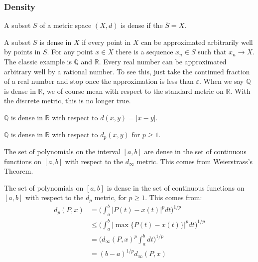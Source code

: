 \documentclass[crop=false,class=article,oneside]{standalone}
\begin{document}
        \subsubsection{Density}
            \begin{definition}
                A subset $S$ of a metric space $(X,d)$
                is dense if the $\overline{S}=X$.
            \end{definition}
            A subset $S$ is dense in $X$ if every point
            in $X$ can be approximated arbitrarily well
            by points in $S$. For any point $x\in{X}$
            there is a sequence $x_{n}\in{S}$
            such that $x_{n}\rightarrow{X}$. The
            classic example is $\mathbb{Q}$ and
            $\mathbb{R}$. Every real number can be
            approximated arbitrary well by a rational
            number. To see this, just take the continued
            fraction of a real number and stop once
            the approximation is less than
            $\varepsilon$. When we say $\mathbb{Q}$ is
            dense in $\mathbb{R}$, we of course mean with
            respect to the standard metric on $\mathbb{R}$.
            With the discrete metric, this is no longer
            true. 
            \begin{example}
                $\mathbb{Q}$ is dense in $\mathbb{R}$
                with respect to $d(x,y)=|x-y|$.
            \end{example}
            \begin{example}
                $\mathbb{Q}$ is dense in
                $\mathbb{R}$ with respect to
                $d_{p}(x,y)$ for $p\geq{1}$.
            \end{example}
            \begin{example}
                The set of polynomials on the interval
                $[a,b]$ are dense in the set of
                continuous functions on $[a,b]$ with
                respect to the $d_{\infty}$ metric.
                This comes from Weierstrass's Theorem.
            \end{example}
            \begin{example}
                The set of polynomials on $[a,b]$
                is dense in the set of continuous
                functions on $[a,b]$ with respect to
                the $d_{p}$ metric, for $p\geq{1}$. This
                comes from:
                \begin{align*}
                    d_{p}(P,x)&=
                    \bigg(
                        \int_{a}^{b}|P(t)-x(t)|^{p}dt
                    \bigg)^{1/p}\\
                    &\leq\bigg(
                        \int_{a}^{b}
                        |\max\{P(t)-x(t)\}|^{p}dt
                    \bigg)^{1/p}\\
                    &=\bigg(
                        d_{\infty}(P,x)^{p}\int_{a}^{b}dt
                    \bigg)^{1/p}\\
                    &=(b-a)^{1/p}d_{\infty}(P,x)
                \end{align*}
            \end{example}
\end{document}
